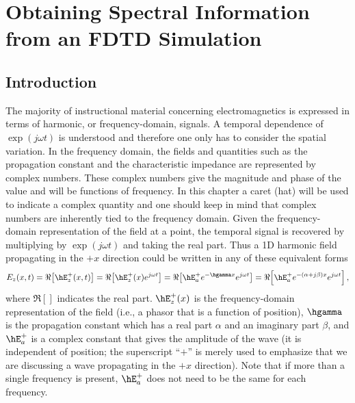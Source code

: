 \chapter[Obtaining FDTD Spectral Information]{Obtaining Spectral
Information from an FDTD Simulation \label{chap:spectrum}}

\renewcommand{\thefootnote}{\fnsymbol{footnote}}

\section{Introduction}

The majority of instructional material concerning electromagnetics is
expressed in terms of harmonic, or frequency-domain, signals.  A
temporal dependence of $\exp(j\omega t)$ is understood and therefore
one only has to consider the spatial variation.  In the frequency
domain, the fields and quantities such as the propagation constant and
the characteristic impedance are represented by complex numbers.
These complex numbers give the magnitude and phase of the value and
will be functions of frequency.  In this chapter a caret (hat) will be
used to indicate a complex quantity and one should keep in mind that
complex numbers are inherently tied to the frequency domain.  Given
the frequency-domain representation of the field at a point, the
temporal signal is recovered by multiplying by $\exp(j\omega t)$ and
taking the real part.  Thus a 1D harmonic field propagating in the
$+x$ direction could be written in any of these equivalent forms
\begin{equation}
E_z(x,t) = 
  \Re\!\left[\hE_z^+(x,t)\right]
   = 
  \Re\!\left[\hE_z^+(x)e^{j\omega t}\right]
   = 
  \Re\!\left[\hE_a^+e^{-\hgamma x}e^{j\omega t}\right]
   = 
  \Re\!\left[\hE_a^+e^{-(\alpha+j\beta) x}e^{j\omega t}\right],
\end{equation}
where $\Re[]$ indicates the real part.  $\hE_z^+(x)$ is the
frequency-domain representation of the field (i.e., a phasor that is a
function of position), $\hgamma$ is the propagation constant which has
a real part $\alpha$ and an imaginary part $\beta$, and $\hE_a^+$ is a
complex constant that gives the amplitude of the wave (it is
independent of position; the superscript ``$+$'' is merely used to
emphasize that we are discussing a wave propagating in the $+x$
direction).  Note that if more than a single frequency is present,
$\hE_a^+$ does not need to be the same for each frequency.

